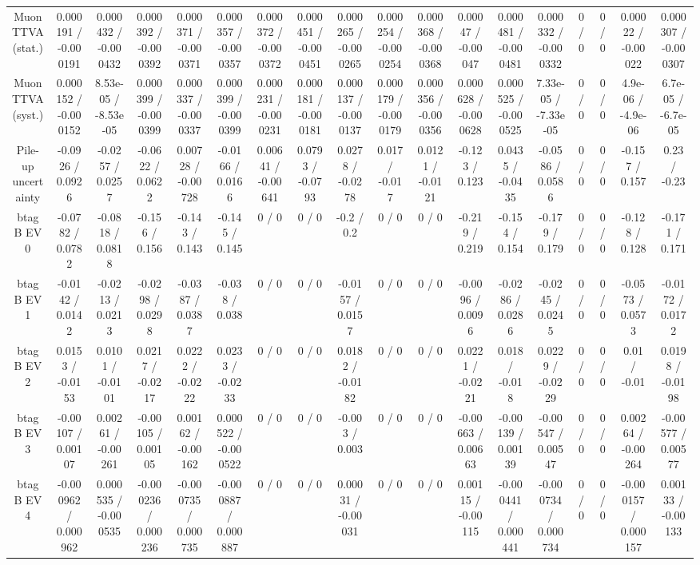 \documentclass[10pt]{article}
\begin{document}
\begin{table}[htbp]
\begin{center}
\begin{tabular}{|c|c|c|c|c|c|c|c|c|c|c|c|c|c|c|c|c|c|}
  Muon TTVA (stat.) & 0.000191 / -0.000191 & 0.000432 / -0.000432 & 0.000392 / -0.000392 & 0.000371 / -0.000371 & 0.000357 / -0.000357 & 0.000372 / -0.000372 & 0.000451 / -0.000451 & 0.000265 / -0.000265 & 0.000254 / -0.000254 & 0.000368 / -0.000368 & 0.00047 / -0.00047 & 0.000481 / -0.000481 & 0.000332 / -0.000332 & 0 / 0 & 0 / 0 & 0.00022 / -0.00022 & 0.000307 / -0.000307 \\ 
  Muon TTVA (syst.) & 0.000152 / -0.000152 & 8.53e-05 / -8.53e-05 & 0.000399 / -0.000399 & 0.000337 / -0.000337 & 0.000399 / -0.000399 & 0.000231 / -0.000231 & 0.000181 / -0.000181 & 0.000137 / -0.000137 & 0.000179 / -0.000179 & 0.000356 / -0.000356 & 0.000628 / -0.000628 & 0.000525 / -0.000525 & 7.33e-05 / -7.33e-05 & 0 / 0 & 0 / 0 & 4.9e-06 / -4.9e-06 & 6.7e-05 / -6.7e-05 \\ 
  Pile-up uncertainty & -0.0926 / 0.0926 & -0.0257 / 0.0257 & -0.0622 / 0.0622 & 0.00728 / -0.00728 & -0.0166 / 0.0166 & 0.00641 / -0.00641 & 0.0793 / -0.0793 & 0.0278 / -0.0278 & 0.017 / -0.017 & 0.0121 / -0.0121 & -0.123 / 0.123 & 0.0435 / -0.0435 & -0.0586 / 0.0586 & 0 / 0 & 0 / 0 & -0.157 / 0.157 & 0.23 / -0.23 \\ 
  btag B EV 0 & -0.0782 / 0.0782 & -0.0818 / 0.0818 & -0.156 / 0.156 & -0.143 / 0.143 & -0.145 / 0.145 & 0 / 0 & 0 / 0 & -0.2 / 0.2 & 0 / 0 & 0 / 0 & -0.219 / 0.219 & -0.154 / 0.154 & -0.179 / 0.179 & 0 / 0 & 0 / 0 & -0.128 / 0.128 & -0.171 / 0.171 \\ 
  btag B EV 1 & -0.0142 / 0.0142 & -0.0213 / 0.0213 & -0.0298 / 0.0298 & -0.0387 / 0.0387 & -0.038 / 0.038 & 0 / 0 & 0 / 0 & -0.0157 / 0.0157 & 0 / 0 & 0 / 0 & -0.0096 / 0.0096 & -0.0286 / 0.0286 & -0.0245 / 0.0245 & 0 / 0 & 0 / 0 & -0.0573 / 0.0573 & -0.0172 / 0.0172 \\ 
  btag B EV 2 & 0.0153 / -0.0153 & 0.0101 / -0.0101 & 0.0217 / -0.0217 & 0.0222 / -0.0222 & 0.0233 / -0.0233 & 0 / 0 & 0 / 0 & 0.0182 / -0.0182 & 0 / 0 & 0 / 0 & 0.0221 / -0.0221 & 0.018 / -0.018 & 0.0229 / -0.0229 & 0 / 0 & 0 / 0 & 0.01 / -0.01 & 0.0198 / -0.0198 \\ 
  btag B EV 3 & -0.00107 / 0.00107 & 0.00261 / -0.00261 & -0.00105 / 0.00105 & 0.00162 / -0.00162 & 0.000522 / -0.000522 & 0 / 0 & 0 / 0 & -0.003 / 0.003 & 0 / 0 & 0 / 0 & -0.00663 / 0.00663 & -0.00139 / 0.00139 & -0.00547 / 0.00547 & 0 / 0 & 0 / 0 & 0.00264 / -0.00264 & -0.00577 / 0.00577 \\ 
  btag B EV 4 & -0.000962 / 0.000962 & 0.000535 / -0.000535 & -0.000236 / 0.000236 & -0.000735 / 0.000735 & -0.000887 / 0.000887 & 0 / 0 & 0 / 0 & 0.00031 / -0.00031 & 0 / 0 & 0 / 0 & 0.00115 / -0.00115 & -0.000441 / 0.000441 & -0.000734 / 0.000734 & 0 / 0 & 0 / 0 & -0.000157 / 0.000157 & 0.00133 / -0.00133 \\ 

\end{tabular}
\end{center}
\end{table}
\end{document}
